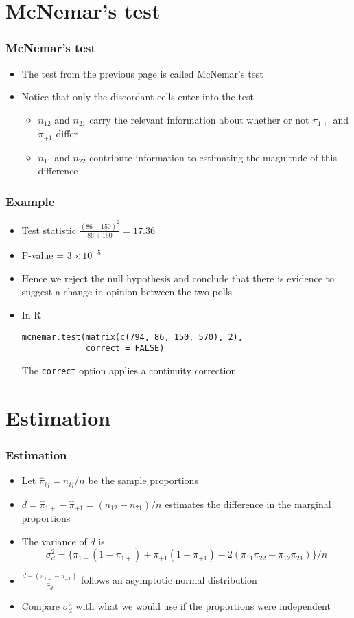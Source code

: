 \documentclass[aspectratio=169]{beamer}
\begin{document}
\section{McNemar's test}
\begin{frame}\frametitle{McNemar's test}
\begin{itemize}
\item The test from the previous page is called McNemar's test
\item Notice that only the discordant cells enter into the test
  \begin{itemize}
  \item $n_{12}$ and $n_{21}$ carry the relevant information about whether
    or not $\pi_{1+}$ and $\pi_{+1}$ differ
  \item $n_{11}$ and $n_{22}$ contribute information to estimating the
    magnitude of this difference
  \end{itemize}
\end{itemize}
\end{frame}

\begin{frame}[fragile]\frametitle{Example}
\begin{itemize}
\item Test statistic $\frac{(86 - 150)^2}{86 + 150} = 17.36$
\item P-value = $3\times 10^{-5}$
\item Hence we reject the null hypothesis and conclude that there is
evidence to suggest a change in opinion
between the two polls
\item In R
\begin{verbatim}
mcnemar.test(matrix(c(794, 86, 150, 570), 2), 
             correct = FALSE)
\end{verbatim}
The \texttt{correct} option applies a continuity correction
\end{itemize}
\end{frame}
 
\section{Estimation}
\begin{frame}\frametitle{Estimation}
\begin{itemize}
\item Let $\hat \pi_{ij} = n_{ij} / n$ be the sample proportions
\item $d = \hat \pi_{1+} - \hat \pi_{+1} = (n_{12} - n_{21})/n$ estimates the difference
  in the marginal proportions
\item The variance of $d$ is 
$$ 
  \sigma_d^2 = \{\pi_{1+}(1 - \pi_{1+}) + \pi_{+1}(1 - \pi_{+1}) - 2 (\pi_{11}\pi_{22} - \pi_{12}\pi_{21})\}/n
$$
\item $\frac{d - (\pi_{1+} - \pi_{+1})}{\hat \sigma_d}$ follows an asymptotic normal distribution
\item Compare $\sigma_d^2$ with what we would use if the proportions were independent
\end{itemize}
\end{frame}
\end{document}
